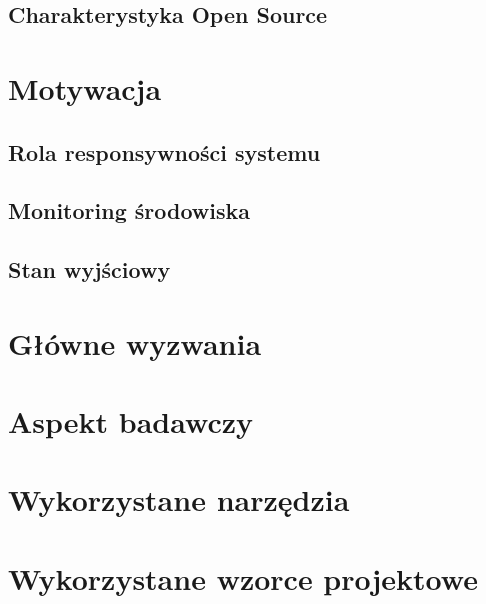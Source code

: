 \subsection{Charakterystyka Open Source}


\section{Motywacja}


\subsection{Rola responsywności systemu}

\cite{html5-perf}
\cite{jakob1993usability}
\cite{dont-let-me-think}

\subsection{Monitoring środowiska}

\subsection{Stan wyjściowy}

\section{Główne wyzwania}
\section{Aspekt badawczy}
\section{Wykorzystane narzędzia}
\section{Wykorzystane wzorce projektowe}
